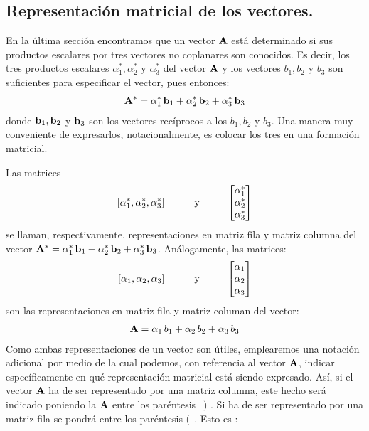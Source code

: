 \documentclass[12pt]{article}
\begin{document}
\subsection{Representación matricial de los vectores.}

En la última sección encontramos que un vector $\vb{A}$ está determinado si sus productos escalares por tres vectores no coplanares son conocidos. Es decir, los tres productos escalares $\alpha_{1}^{*}, \alpha_{2}^{*}$ y $\alpha_{3}^{*}$ del vector $\vb{A}$ y los vectores 
$b_{1}, b_{2}$ y $b_{3}$ son suficientes para especificar el vector, pues entonces:
\begin{align*}
\vb{A}^{*} = \alpha_{1}^{*} \, \vb{b}_{1} + \alpha_{2}^{*} \, \vb{b}_{2} + \alpha_{3}^{*} \, \vb{b}_{3}    
\end{align*}
donde $\vb{b}_{1}, \vb{b}_{2}$ y $\vb{b}_{3}$ son los vectores recíprocos a los $b_{1}, b_{2}$ y $b_{3}$. Una manera muy conveniente de expresarlos, notacionalmente, es colocar los tres en una formación matricial. 
\par
Las matrices 
\begin{align*}
\left[ \alpha_{1}^{*}, \alpha_{2}^{*}, \alpha_{3}^{*} \right] \hspace{1cm} \text{y} \hspace{1cm} \mqty[ \alpha_{1}^{*} \\ \alpha_{2}^{*} \\ \alpha_{3}^{*} ]
\end{align*}
se llaman, respectivamente, representaciones en matriz fila y matriz columna del vector $\vb{A}^{*} = \alpha_{1}^{*} \, \vb{b}_{1} + \alpha_{2}^{*} \, \vb{b}_{2} + \alpha_{3}^{*} \, \vb{b}_{3}$. Análogamente, las matrices:
\begin{align*}
\left[ \alpha_{1}, \alpha_{2}, \alpha_{3} \right] \hspace{1cm} \text{y} \hspace{1cm} \mqty[ \alpha_{1} \\ \alpha_{2} \\ \alpha_{3} ]
\end{align*}
son las representaciones en matriz fila y matriz columan del vector:
\begin{align*}
\vb{A} = \alpha_{1} \, b_{1} + \alpha_{2} \, b_{2} + \alpha_{3} \, b_{3}
\end{align*}
Como ambas representaciones de un vector son útiles, emplearemos una notación adicional por medio de la cual podemos, con referencia al vector $\vb{A}$, indicar específicamente en qué representación matricial está siendo expresado. Así, si el vector $\vb{A}$ ha de ser representado por una matriz columna, este hecho será indicado poniendo la $\vb{A}$ entre los paréntesis $|\, )$ . Si ha de ser  representado por una matriz fila se pondrá entre los paréntesis $( \, |$. Esto es :
\end{document}
